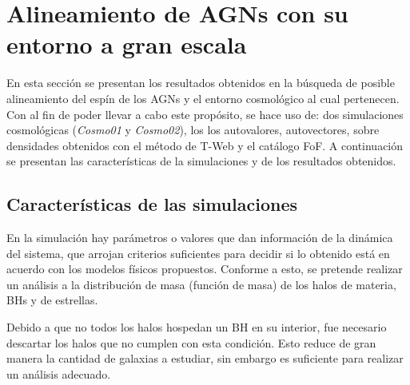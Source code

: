 \begin{savequote}[50mm]
\end{savequote}




\chapter{Alineamiento de AGNs con su entorno a gran escala}
\label{cha:cosmic_web}

En esta sección se presentan los resultados obtenidos en la búsqueda de posible alineamiento del espín de los AGNs y el entorno cosmológico al cual pertenecen. Con al fin de poder llevar a cabo este propósito, se hace uso de: dos simulaciones cosmológicas ({\it{Cosmo01}} y {\it{Cosmo02}}), los los autovalores, autovectores, sobre densidades obtenidos con el método de T-Web y el catálogo FoF. A continuación se presentan las características de la simulaciones y de los resultados obtenidos.

\section{Características de las simulaciones}
\label{sec: propiedades en las simulaciones}

En la simulación hay parámetros o valores que dan información de la dinámica del sistema,  que arrojan criterios suficientes para decidir si lo obtenido está en acuerdo con los modelos físicos propuestos. 
Conforme a esto, se pretende realizar un análisis a la distribución de masa (función de masa) de los halos de materia, BHs y de estrellas. 

Debido a que no todos los halos hospedan un BH en su interior, fue necesario descartar los halos que no cumplen con esta condición. Esto reduce de gran manera la cantidad de galaxias a estudiar, sin embargo es suficiente para realizar un análisis adecuado.

